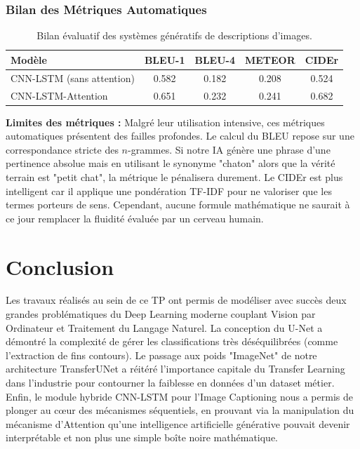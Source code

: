 \documentclass[12pt, a4paper]{article}
\begin{document}
\subsubsection*{Bilan des Métriques Automatiques}
\begin{table}[H]
\centering
\begin{tabular}{@{}lcccc@{}}
\toprule
\textbf{Modèle} & \textbf{BLEU-1} & \textbf{BLEU-4} & \textbf{METEOR} & \textbf{CIDEr} \\ \midrule
CNN-LSTM (sans attention) & 0.582 & 0.182 & 0.208 & 0.524 \\
CNN-LSTM-Attention        & 0.651 & 0.232 & 0.241 & 0.682 \\ \bottomrule
\end{tabular}
\caption{Bilan évaluatif des systèmes génératifs de descriptions d'images.}
\end{table}

\textbf{Limites des métriques :} 
Malgré leur utilisation intensive, ces métriques automatiques présentent des failles profondes. Le calcul du BLEU repose sur une correspondance stricte des $n$-grammes. Si notre IA génère une phrase d'une pertinence absolue mais en utilisant le synonyme "chaton" alors que la vérité terrain est "petit chat", la métrique le pénalisera durement. Le CIDEr est plus intelligent car il applique une pondération TF-IDF pour ne valoriser que les termes porteurs de sens. Cependant, aucune formule mathématique ne saurait à ce jour remplacer la fluidité évaluée par un cerveau humain.

\newpage
\section{Conclusion}
Les travaux réalisés au sein de ce TP ont permis de modéliser avec succès deux grandes problématiques du Deep Learning moderne couplant Vision par Ordinateur et Traitement du Langage Naturel. 
La conception du U-Net a démontré la complexité de gérer les classifications très déséquilibrées (comme l'extraction de fins contours). Le passage aux poids "ImageNet" de notre architecture TransferUNet a réitéré l'importance capitale du Transfer Learning dans l'industrie pour contourner la faiblesse en données d'un dataset métier.
Enfin, le module hybride CNN-LSTM pour l'Image Captioning nous a permis de plonger au cœur des mécanismes séquentiels, en prouvant via la manipulation du mécanisme d'Attention qu'une intelligence artificielle générative pouvait devenir interprétable et non plus une simple boîte noire mathématique.
\end{document}
